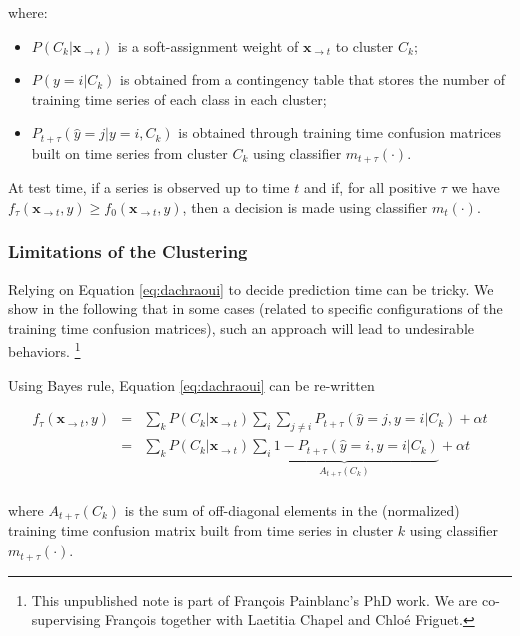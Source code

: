 where:

\begin{itemize}
\item $P(C_k | \mathbf{x}_{\rightarrow t})$ is a soft-assignment weight of
$\mathbf{x}_{\rightarrow t}$ to cluster $C_k$;
\item $P(y=i | C_k)$ is obtained from a contingency table that stores the number of
training time series of each class in each cluster;
\item $P_{t+\tau}(\hat{y} = j | y=i, C_k)$ is obtained through training time
confusion matrices built on time series from cluster $C_k$ using classifier
$m_{t+\tau}(\cdot)$.
\end{itemize}

At test time, if a series is observed up to time $t$ and if, for all positive
$\tau$ we have
$f_\tau(\mathbf{x}_{\rightarrow t}, y) \geq f_0(\mathbf{x}_{\rightarrow t}, y)$,
then a decision is made using classifier $m_t(\cdot)$.

\subsubsection{Limitations of the Clustering}

Relying on Equation \eqref{eq:dachraoui} to decide prediction time can be
tricky. We show in the following that in some cases (related to specific
configurations of the training time confusion matrices), such an approach will
lead to undesirable behaviors.%
\footnote{This unpublished note is part of François Painblanc's PhD work.
We are co-supervising François together with Laetitia Chapel and Chloé Friguet.}

Using Bayes rule, Equation \eqref{eq:dachraoui} can be re-written

\begin{eqnarray}
    f_\tau(\mathbf{x}_{\rightarrow t}, y) &=&
        \sum_k P(C_k | \mathbf{x}_{\rightarrow t})
        \sum_i
        \sum_{j \neq i} P_{t+\tau}(\hat{y} = j, y=i | C_k)
        + \alpha t \\
    &=&
        \sum_k P(C_k | \mathbf{x}_{\rightarrow t})
        \underbrace{\sum_i 1 - P_{t+\tau}(\hat{y} = i, y=i | C_k)}_{A_{t+\tau}(C_k)}
        + \alpha t \\
\end{eqnarray}

where $A_{t+\tau}(C_k)$ is the sum of off-diagonal elements in the (normalized)
training time confusion matrix built from time series in cluster $k$ using
classifier $m_{t+\tau}(\cdot)$.

